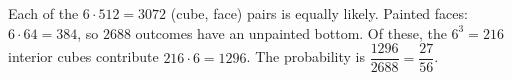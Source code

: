 Each of the $6\cdot512=3072$ (cube, face) pairs is equally likely. Painted faces: $6\cdot64=384$, so $2688$ outcomes have an unpainted bottom. Of these, the $6^3=216$ interior cubes contribute $216\cdot6=1296$. The probability is $\dfrac{1296}{2688}=\boxed{\dfrac{27}{56}}$.
